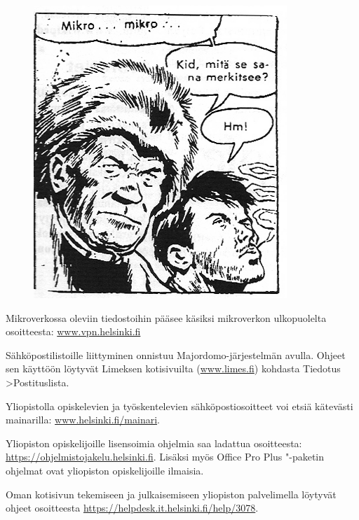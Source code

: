 \documentclass[a5paper, 8pt, twocolumn]{book} %
\numberwithin{equation}{section}
\begin{document}
\begin{figure}[!b]
	\centering
	\includegraphics[width=\columnwidth]{mikroverkko.png}
\end{figure}
Mikroverkossa oleviin tiedostoihin pääsee
käsiksi mikroverkon ulkopuolelta osoitteesta:
\url{www.vpn.helsinki.fi}

Sähköpostilistoille liittyminen onnistuu
Majordomo-järjestelmän avulla. Ohjeet sen
käyttöön löytyvät Limeksen kotisivuilta
(\url{www.limes.fi}) kohdasta Tiedotus \textgreater Postituslista.

Yliopistolla opiskelevien ja työskentelevien
sähköpostiosoitteet voi etsiä kätevästi
mainarilla: \url{www.helsinki.fi/mainari}.

Yliopiston opiskelijoille lisensoimia
ohjelmia saa ladattua osoitteesta: \url{https://ohjelmistojakelu.helsinki.fi}.
Lisäksi myös Office Pro Plus "-paketin ohjelmat ovat yliopiston opiskelijoille ilmaisia.

Oman kotisivun tekemiseen ja julkaisemiseen
yliopiston palvelimella löytyvät
ohjeet osoitteesta \url{https://helpdesk.it.helsinki.fi/help/3078}.
\end{document}

